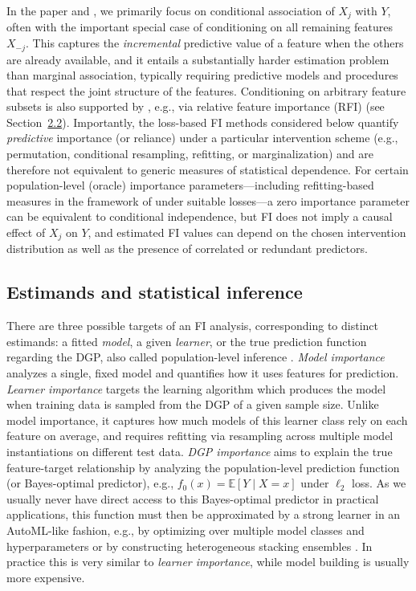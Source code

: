 In the paper and , we primarily focus on conditional association of \(X_j\) with \(Y\), often with the important special case of conditioning on all remaining features \(X_{-j}\).
This captures the \emph{incremental} predictive value of a feature when the others are already available, and it entails a substantially harder estimation problem than marginal association, typically requiring predictive models and procedures that respect the joint structure of the features.
Conditioning on arbitrary feature subsets is also supported by , e.g., via relative feature importance (RFI) (see Section~\hyperref[sec-fi-perturbation]{2.2}).
Importantly, the loss-based FI methods considered below quantify \emph{predictive} importance (or reliance) under a particular intervention scheme (e.g., permutation, conditional resampling, refitting, or marginalization) and are therefore not equivalent to generic measures of statistical dependence.
For certain population-level (oracle) importance parameters---including refitting-based measures in the framework of \citet{williamson2023generalframeworkb} under suitable losses---a zero importance parameter can be equivalent to conditional independence, but FI does not imply a causal effect of \(X_j\) on \(Y\), and estimated FI values can depend on the chosen intervention distribution as well as the presence of correlated or redundant predictors.

\subsection{Estimands and statistical inference}\label{sec-fi-estimands}

There are three possible targets of an FI analysis, corresponding to distinct estimands:
a fitted \emph{model}, a given \emph{learner}, or the true prediction function regarding the DGP, also called population-level inference \citep[see also][]{chiaburu2024uncertainty, molnar2023relatingpartialc}.
\emph{Model importance} analyzes a single, fixed model and quantifies how it uses features for prediction.
\emph{Learner importance} targets the learning algorithm which produces the model when training data is sampled from the DGP of a given sample size.
Unlike model importance, it captures how much models of this learner class rely on each feature on average, and requires refitting via resampling across multiple model instantiations on different test data.
\emph{DGP importance} aims to explain the true feature-target relationship by analyzing the population-level prediction function (or Bayes-optimal predictor), e.g., \(f_0(x) = \mathbb{E}[Y \mid X = x]\) under \(\ell_2\) loss.
As we usually never have direct access to this Bayes-optimal predictor in practical applications, this function must then be approximated by a strong learner in an AutoML-like fashion, e.g., by optimizing over multiple model classes and hyperparameters \citep{thornton2013autoweka} or by constructing heterogeneous stacking ensembles \citep{erickson2020autogluontabular, vanderlaan2007superlearner}.
In practice this is very similar to \emph{learner importance}, while model building is usually more expensive.

